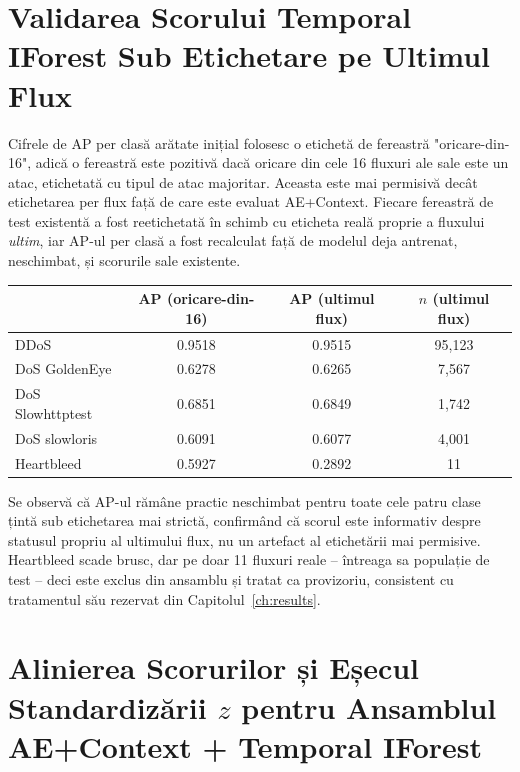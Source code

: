 \chapter{Validarea Scorului Temporal IForest Sub Etichetare pe Ultimul Flux}
\label{ch:temporal-iforest-last-flow-validation}

Cifrele de AP per clasă arătate inițial folosesc o etichetă de fereastră "oricare-din-16", adică o fereastră este pozitivă dacă oricare din cele 16 fluxuri ale sale este un atac, etichetată cu tipul de atac majoritar.
Aceasta este mai permisivă decât etichetarea per flux față de care este evaluat AE+Context. Fiecare fereastră de test existentă a fost reetichetată în schimb cu eticheta reală proprie a fluxului \emph{ultim}, iar AP-ul per clasă a fost recalculat față de modelul deja antrenat, neschimbat, și scorurile sale existente.

\begin{center}
\begin{tabular}{@{}lccc@{}}
\toprule
 & AP (oricare-din-16) & AP (ultimul flux) & $n$ (ultimul flux) \\
\midrule
DDoS              & 0.9518 & 0.9515 & 95{,}123 \\
DoS GoldenEye     & 0.6278 & 0.6265 & 7{,}567 \\
DoS Slowhttptest  & 0.6851 & 0.6849 & 1{,}742 \\
DoS slowloris     & 0.6091 & 0.6077 & 4{,}001 \\
Heartbleed        & 0.5927 & 0.2892 & 11 \\
\bottomrule
\end{tabular}
\end{center}

Se observă că AP-ul rămâne practic neschimbat pentru toate cele patru clase țintă sub etichetarea mai strictă, confirmând că scorul este informativ despre statusul propriu al ultimului flux, nu un artefact al etichetării mai permisive.
Heartbleed scade brusc, dar pe doar 11 fluxuri reale -- întreaga sa populație de test -- deci este exclus din ansamblu și tratat ca provizoriu, consistent cu tratamentul său rezervat din Capitolul~\ref{ch:results}.

\chapter{Alinierea Scorurilor și Eșecul Standardizării \texorpdfstring{$z$}{z} pentru Ansamblul AE+Context + Temporal IForest}
\label{ch:ensemble-score-alignment}

